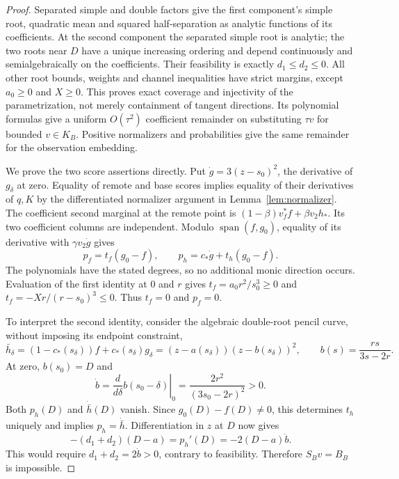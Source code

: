 \begin{proof}
Separated simple and double factors give the first component's simple
root, quadratic mean and squared half-separation as analytic functions
of its coefficients. At the second component the separated simple root
is analytic; the two roots near $D$ have a unique increasing ordering
and depend continuously and semialgebraically on the coefficients.
Their feasibility is exactly $d_1\le d_2\le0$. All other root bounds,
weights and channel inequalities have strict margins, except $a_0\ge0$
and $X\ge0$. This proves exact coverage and injectivity of the
parametrization, not merely containment of tangent directions. Its
polynomial formulas give a uniform $O(\tau^2)$ coefficient remainder
on substituting $\tau v$ for bounded $v\in K_B$. Positive normalizers
and probabilities give the same remainder for the observation embedding.

We prove the two score assertions directly. Put $\dot g=3(z-s_0)^2$,
the derivative of $g_\delta$ at zero. Equality of remote and base scores
implies equality of their derivatives of $q,K$ by the differentiated
normalizer argument in Lemma~\ref{lem:normalizer}. The coefficient
second marginal at the remote point is
$(1-\beta)v_f^* f+\beta v_2 h_*$. Its two coefficient columns are
independent. Modulo $\operatorname{span}(f,g_0)$, equality of its
derivative with $\gamma v_2\dot g$ gives
\[
 p_f=t_f(g_0-f),\qquad p_h=c_*\dot g+t_h(g_0-f).
\]
The polynomials have the stated degrees, so no additional monic direction
occurs. Evaluation of the first identity at $0$ and $r$ gives
$t_f=a_0r^2/s_0^3\ge0$ and $t_f=-Xr/(r-s_0)^3\le0$.
Thus $t_f=0$ and $p_f=0$.

To interpret the second identity, consider the algebraic double-root
pencil curve, without imposing its endpoint constraint,
\[
 \bar h_\delta=(1-c_*(s_\delta))f+c_*(s_\delta)g_\delta
              =(z-a(s_\delta))(z-b(s_\delta))^2,
 \qquad b(s)=\frac{rs}{3s-2r}.
\]
At zero, $b(s_0)=D$ and
\begin{equation}\label{eq:outward-speed}
 \dot b=\left.\frac{d}{d\delta}b(s_0-\delta)\right|_0
               =\frac{2r^2}{(3s_0-2r)^2}>0.
\end{equation}
Both $p_h(D)$ and $\dot{\bar h}(D)$ vanish. Since
$g_0(D)-f(D)\ne0$, this determines $t_h$ uniquely and implies
$p_h=\dot{\bar h}$. Differentiation in $z$ at $D$ now gives
\[
 -(d_1+d_2)(D-a)=p_h'(D)=-2(D-a)\dot b.
\]
This would require $d_1+d_2=2\dot b>0$, contrary to feasibility.
Therefore $S_Bv=B_B$ is impossible.


\end{proof}
